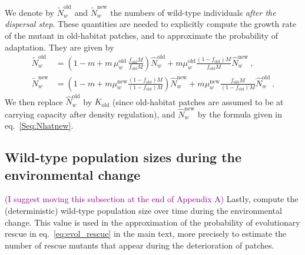\documentclass[11pt]{article}
\newcommand{\florence}[1]{\textcolor{purple}{(#1)}} %
\begin{document}
We denote by $\widetilde{N}_w^{\text{old}}$ and $\widetilde{N}_w^{\text{new}}$ the numbers of wild-type individuals \textit{after the dispersal step}. These quantities are needed to explicitly compute the growth rate of the mutant in old-habitat patches, and to approximate the probability of adaptation. They are given by
%
\begin{subequations}\label{Seq:Ntilde}
\begin{align}
\widetilde{N}_w^{\text{old}} &= \left(1-m + m\, \mu_w^{\text{old}} \,  \frac{f_{\text{old}}M}{f_{\text{old}}M} \right) \widehat{N}_w^{\text{old}} + m \mu_w^{\text{old}} \frac{(1-f_{\text{old}})M}{f_{\text{old}}M}\widehat{N}_w^{\text{new}}\ , \label{Seq:Ntildeold}\\
%
%
\widetilde{N}_w^{\text{new}} &= \left(1-m + m \mu_w^{\text{new}} \frac{(1-f_{\text{old}})M}{(1-f_{\text{old}})M}\right)\widehat{N}_w^{\text{new}} + m \mu_w^{\text{new}} \frac{f_{\text{old}} M}{(1-f_{\text{old}})M} \widehat{N}_w^{\text{old}}\ .\label{Seq:Ntildenew}
\end{align}
\end{subequations}
%
We then replace $\widehat{N}_w^{\text{old}}$ by $K_{\text{old}}$ (since old-habitat patches are assumed to be at carrying capacity after density regulation), and $\widehat{N}_w^{\text{new}}$ by the formula given in eq.~\eqref{Seq:Nhatnew}.


\subsection{Wild-type population sizes during the environmental change \label{sec:app:WTpopsizeEnv}}
\florence{I suggest moving this subsection at the end of Appendix A}
Lastly, compute the (deterministic) wild-type population size over time during the environmental change. This value is used in the approximation of the probability of evolutionary rescue in eq.~\eqref{eq:evol_rescue} in the main text, more precisely to estimate the number of rescue mutants that appear during the deterioration of patches.
\end{document}
